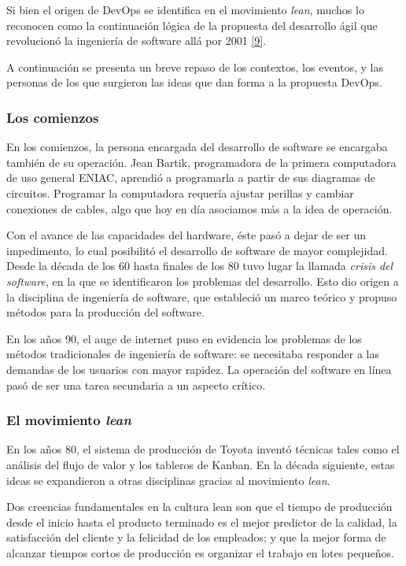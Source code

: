 Si bien el origen de DevOps se identifica en el movimiento \textit{lean}, muchos lo reconocen como la continuación lógica de la propuesta del desarrollo ágil que revolucionó la ingeniería de software allá por 2001 \href{https://www.zotero.org/google-docs/?v6JCer}{[9]}.

A continuación se presenta un breve repaso de los contextos, los eventos, y las personas de los que surgieron las ideas  que dan forma a la propuesta DevOps.

\subsubsection{Los comienzos}

En los comienzos, la persona encargada del desarrollo de software se encargaba también de su operación. Jean Bartik, programadora de la primera computadora de uso general ENIAC, aprendió a programarla a partir de sus diagramas de circuitos. Programar la computadora requería ajustar perillas y cambiar conexiones de cables, algo que hoy en día asociamos más a la idea de operación.

Con el avance de las capacidades del hardware, éste pasó a dejar de ser un impedimento, lo cual posibilitó el desarrollo de software de mayor complejidad. Desde la década de los 60 hasta finales de los 80 tuvo lugar la llamada \textit{crisis del software}, en la que se identificaron los problemas del desarrollo. Esto dio origen a la disciplina de ingeniería de software, que estableció un marco teórico y propuso métodos para la producción del software.

En los años 90, el auge de internet puso en evidencia los problemas de los métodos tradicionales de ingeniería de software: se necesitaba responder a las demandas de los usuarios con mayor rapidez. La operación del software en línea pasó de ser una tarea secundaria a un aspecto crítico.

\subsubsection{El movimiento \textit{lean}}

En los años 80, el sistema de producción de Toyota inventó técnicas tales como el análisis del flujo de valor y los tableros de Kanban. En la década siguiente, estas ideas se expandieron a otras disciplinas gracias al movimiento \textit{lean}.

Dos creencias fundamentales en la cultura lean son que el tiempo de producción desde el inicio hasta el producto terminado es el mejor predictor de la calidad, la satisfacción del cliente y la felicidad de los empleados; y que la mejor forma de alcanzar tiempos cortos de producción es organizar el trabajo en lotes pequeños.

